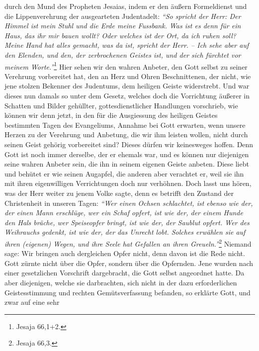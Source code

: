 durch den Mund des Propheten Jesaias, indem er den
äußern Formeldienst und
die Lippenverehrung der ausgearteten Judentadelt:
\textit{"`So spricht der Herr: Der
Himmel ist mein Stuhl und die Erde meine Fussbank. Was ist es denn für ein
Haus, das ihr mir bauen wollt? Oder welches ist der Ort, da ich ruhen soll?
Meine Hand hat alles gemacht, was da ist, spricht der Herr. -- Ich sehe aber auf
den Elenden, und den, der zerbrochenen Geistes ist, und der sich fürchtet vor
meinem Worte."'}\footnote{Jesaja 66,1+2.}
Hier sehen wir den wahren Anbeter, den
Gott selbst zu seiner Verehrung vorbereitet hat, den an Herz und Ohren
Beschnittenen, der nicht, wie jene stolzen Bekenner des
Judentums, dem
heiligen Geiste widerstrebt. Und war dieses nun damals
so unter dem Gesetz, welches doch die Vorrichtung
äußerer
in Schatten und
Bilder gehüllter, gottesdienstlicher Handlungen vorschrieb, wie können wir denn
jetzt, in den für die Ausgiessung des heiligen Geistes bestimmten Tagen des
Evangeliums, Annahme bei Gott erwarten, wenn unsere Herzen
zu der Verehrung und
Anbetung, die wir ihm leisten wollen, nicht durch seinen Geist gehörig
vorbereitet sind? Dieses dürfen wir keinesweges hoffen. Denn Gott ist noch immer
derselbe, der er ehemals war, und es können nur
diejenigen seine wahren Anbeter sein, die ihn in seinem
eigenen Geiste anbeten.
Diese liebt und behütet er wie seinen Augapfel, die anderen aber verachtet er,
weil sie ihn mit ihren eigenwilligen Verrichtungen doch nur verhöhnen. Doch
lasst uns hören, was der Herr weiter zu jenem Volke sagte, denn es betrifft den
Zustand der Christenheit in unseren Tagen:
\textit{"`Wer einen Ochsen schlachtet, ist
ebenso wie der, der einen Mann erschlüge, wer ein Schaf opfert, ist wie der, der
einem
Hunde den Hals bräche, wer Speiseopfer bringt, ist wie der, der Saublut
opfert. Wer des Weihrauchs gedenkt, ist wie der, der
das Unrecht lobt. Solches erwählen sie auf ihren (eigenen) Wegen, und ihre Seele
hat Gefallen an ihren Greueln."'}\footnote{Jesaja 66,3.}
Niemand sage: Wir bringen
auch dergleichen Opfer nicht, denn davon ist die Rede nicht. Gott zürnte nicht
über die Opfer, sondern über die Opfernden. Jene wurden nach einer gesetzlichen
Vorschrift dargebracht, die Gott selbst angeordnet hatte. Da aber diejenigen,
welche sie darbrachten, sich nicht in der dazu erforderlichen Geistesstimmung
und rechten Gemütsverfassung befanden, so erklärte Gott, und zwar auf eine sehr
